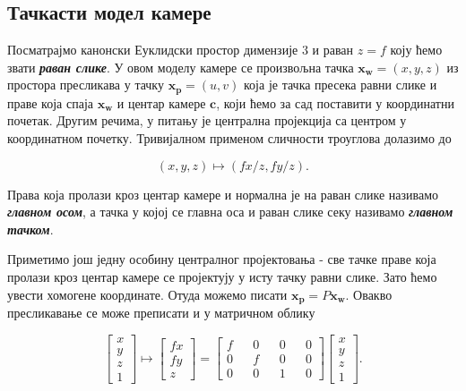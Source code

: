 \documentclass[12pt, a4paper, twoside]{book}
\numberwithin{equation}{chapter}
\numberwithin{theorem}{section}
\numberwithin{definition}{section}
\numberwithin{definitionChapter}{chapter}
\begin{document}
	\subsection{Тачкасти модел камере}
	Посматрајмо канонски Еуклидски простор димензије $3$ и раван $z=f$ коју ћемо звати
	\textbf{\textit{раван слике}}. У овом моделу камере се произвољна тачка $\mathbf{x_w}=(x, y, z)$ из простора
	пресликава у тачку $\mathbf{x_p}=(u,v)$ која је тачка пресека равни слике и праве која спаја $\mathbf{x_w}$
	и центар камере $\mathbf{c}$, који ћемо за сад поставити у координатни почетак.	Другим речима, у питању је централна
	пројекција са центром у координатном почетку. Тривијалном применом сличности троуглова долазимо до
	
	\begin{equation}
		(x, y, z) \mapsto (fx/z, fy/z).
	\end{equation}

	Права која пролази кроз центар камере и нормална је на раван слике називамо \textbf{\textit{главном осом}},
	а тачка у којој се главна оса и раван слике секу називамо \textbf{\textit{главном тачком}}.
	
	Приметимо још једну особину централног пројектовања - све тачке праве која пролази кроз центар
	камере се пројектују у исту тачку равни слике. Зато ћемо увести хомогене координате. Отуда
	можемо писати $\mathbf{x_p} = P\mathbf{x_w}$. Овакво пресликавање се може преписати и у
	матричном облику
	
	\begin{equation}
		\begin{bmatrix}
			x \\
			y \\
			z \\
			1
		\end{bmatrix}
		\mapsto
		\begin{bmatrix}
			fx \\
			fy \\
			z
		\end{bmatrix}
		=
		\begin{bmatrix}
			f && 0 && 0 && 0 \\
			0 && f && 0 && 0 \\
			0 && 0 && 1 && 0
		\end{bmatrix}
		\begin{bmatrix}
			x \\
			y \\
			z \\
			1
		\end{bmatrix}.
		\label{eqn-px}
	\end{equation}
\end{document}
